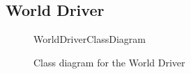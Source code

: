 \subsection{World Driver}

\begin{figure}[H]
[width=8cm]{WorldDriverClassDiagram}

	\caption{Class diagram for the World Driver}

\end{figure}